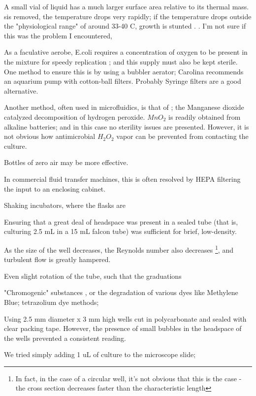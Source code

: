 \documentclass[paper.tex]{subfiles}
\begin{document}
A small vial of liquid has a much larger surface area relative to its thermal mass. sis removed, the temperature drops very rapidly; if the temperature drops outside the "physiological range" of around 33-40 C, growth is stunted \cite{effect2003}. \cite{growth1946}. I'm not sure if this was the problem I encountered, 

As a faculative aerobe, E.coli requires a concentration of oxygen to be present in the mixture for speedy replication \cite{Effect1965}; and this supply must also be kept sterile. One method to ensure this is by using a bubbler aerator; Carolina recommends an aquarium pump with cotton-ball filters. Probably Syringe filters are a good alternative.

Another method, often used in microfluidics\cite{Microfluidic}, is that of \cite{method1951}; the Manganese dioxide catalyzed decomposition of hydrogen peroxide. $MnO_2$ is readily obtained from alkaline batteries; and in this case no sterility issues are presented. However, it is not obvious how antimicrobial $H_2O_2$ vapor can be prevented from contacting the culture.

Bottles of zero air may be more effective.

In commercial fluid transfer machines, this is often resolved by HEPA filtering the input to an enclosing cabinet.

Shaking incubators, where the flasks are 

Ensuring that a great deal of headspace was present in a sealed tube (that is, culturing 2.5 mL in a 15 mL falcon tube) was sufficient for brief, low-density.



As the size of the well decreases, the Reynolds number also decreases \footnote{In fact, in the case of a circular well, it's not obvious that this is the case - the cross section decreases faster than the characteristic length}, and turbulent flow is greatly hampered.

Even slight rotation of the tube, such that the graduations 

"Chromogenic" substances \cite{Fluorogenic1991}, or the degradation of various dyes like Methylene Blue; tetrazolium dye methods;

Using 2.5 mm diameter x 3 mm high wells cut in polycarbonate and sealed with clear packing tape. However, the presence of small bubbles in the headspace of the wells prevented a consistent reading.

We tried simply adding 1 uL of culture to the microscope slide;
\end{document}
